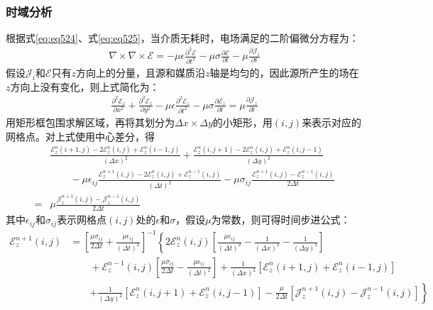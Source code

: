 \documentclass{article}
\numberwithin{equation}{section}
\renewcommand{\vec}[1]{\boldsymbol{#1}}
\begin{document}
\subsubsection{时域分析}
根据式\ref{eq:eq524}、式\ref{eq:eq525}，当介质无耗时，电场满足的二阶偏微分方程为：
\begin{align}
    \label{eq:eq554}
    \nabla \times \nabla \times \vec{\mathcal{E}}=-\mu\epsilon\frac{\partial^2 \vec{\mathcal{E}}}{\partial t^2}-\mu\sigma\frac{\partial \vec{\mathcal{E}}}{\partial t}-\mu\frac{\partial\vec{\mathcal{J}}_{i}}{\partial t}
\end{align}
假设$\vec{\mathcal{J}}_{i}$和$\vec{\mathcal{E}}$只有$z$方向上的分量，且源和媒质沿$z$轴是均匀的，因此源所产生的场在$z$方向上没有变化，则上式简化为：
\begin{align}
    \label{eq:eq555}
    \frac{\partial^2 \mathcal{E}_z}{\partial x^2}+\frac{\partial^2 \mathcal{E}_z}{\partial y^2}-\mu\epsilon\frac{\partial^2 \mathcal{E}_z}{\partial t^2}-\mu\sigma\frac{\partial\mathcal{E}_z}{\partial t}=\mu\frac{\partial\mathcal{J}_{z}}{\partial t}
\end{align}
用矩形框包围求解区域，再将其划分为$\Delta x\times\Delta y$的小矩形，用$(i,j)$来表示对应的网格点。对上式使用中心差分，得
\begin{align}
    \label{eq:eq556}
    &\frac{\mathcal{E}_z^{n}(i+1,j)-2\mathcal{E}_z^{n}(i,j)+\mathcal{E}_z^{n}(i-1,j)}{(\Delta x)^2}+\frac{\mathcal{E}_z^{n}(i,j+1)-2\mathcal{E}_z^{n}(i,j)+\mathcal{E}_z^{n}(i,j-1)}{(\Delta y)^2} \nonumber \\
    &\qquad-\mu\epsilon_{ij}\frac{\mathcal{E}_z^{n+1}(i,j)-2\mathcal{E}_z^{n}(i,j)+\mathcal{E}_z^{n-1}(i,j)}{(\Delta t)^2}-\mu\sigma_{ij}\frac{\mathcal{E}_z^{n+1}(i,j)-\mathcal{E}_z^{n-1}(i,j)}{2\Delta t} \nonumber \\
    =&\mu\frac{\mathcal{J}_z^{n+1}(i,j)-\mathcal{J}_z^{n-1}(i,j)}{2\Delta t}
\end{align}
其中$\epsilon_{ij}$和$\sigma_{ij}$表示网格点$(i,j)$处的$\epsilon$和$\sigma$，假设$\mu$为常数，则可得时间步进公式：
\begin{align}
    \label{eq:eq557}
    \mathcal{E}_z^{n+1}(i,j)&=\left[\frac{\mu\sigma_{ij}}{2\Delta t}+\frac{\mu\epsilon_{ij}}{(\Delta t)^2}\right]^{-1}\left\{2\mathcal{E}_z^{n}(i,j)\left[\frac{\mu\epsilon_{ij}}{(\Delta t)^2}-\frac{1}{(\Delta x)^2}-\frac{1}{(\Delta y)^2}\right]\right. \nonumber \\
                            &\qquad+\mathcal{E}_z^{n-1}(i,j)\left[\frac{\mu\sigma_{ij}}{2\Delta t}-\frac{\mu\epsilon_{ij}}{(\Delta t)^2}\right]+\frac{1}{(\Delta x)^2}\left[\mathcal{E}_z^{n}(i+1,j)+\mathcal{E}_z^{n}(i-1,j)\right] \nonumber \\
                            &\qquad\left.+\frac{1}{(\Delta y)^2}\left[\mathcal{E}_z^{n}(i,j+1)+\mathcal{E}_z^{n}(i,j-1)\right]-\frac{\mu}{2\Delta t}\left[\mathcal{J}_z^{n+1}(i,j)-\mathcal{J}_z^{n-1}(i,j)\right]\right\}
\end{align}
\end{document}
